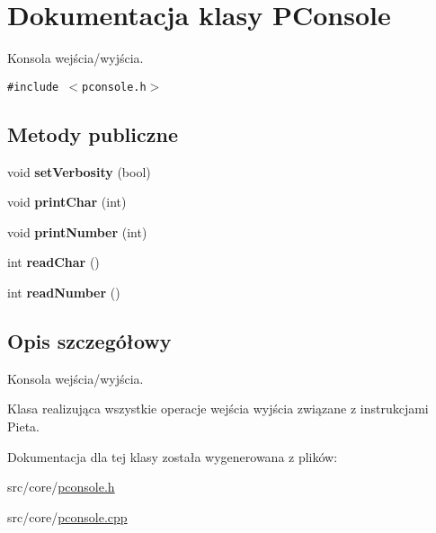 \hypertarget{classPConsole}{
\section{Dokumentacja klasy PConsole}
\label{classPConsole}
}
Konsola wejścia/wyjścia.  


{\tt \#include $<$pconsole.h$>$}

\subsection*{Metody publiczne}
\begin{CompactItemize}
\item 
\hypertarget{classPConsole_b5446c4f888fe9552788a2e757f23b6b}{
void \textbf{setVerbosity} (bool)}
\label{classPConsole_b5446c4f888fe9552788a2e757f23b6b}

\item 
\hypertarget{classPConsole_1c0c7c5be680cdb2e456e3e34798c7a6}{
void \textbf{printChar} (int)}
\label{classPConsole_1c0c7c5be680cdb2e456e3e34798c7a6}

\item 
\hypertarget{classPConsole_744226ceb9724625cadf1124a2b87f55}{
void \textbf{printNumber} (int)}
\label{classPConsole_744226ceb9724625cadf1124a2b87f55}

\item 
\hypertarget{classPConsole_5bf368ed172de8c7e8221973b3c613c3}{
int \textbf{readChar} ()}
\label{classPConsole_5bf368ed172de8c7e8221973b3c613c3}

\item 
\hypertarget{classPConsole_fbe2b8e906db6d9fc70397d8a9b4105c}{
int \textbf{readNumber} ()}
\label{classPConsole_fbe2b8e906db6d9fc70397d8a9b4105c}

\end{CompactItemize}


\subsection{Opis szczegółowy}
Konsola wejścia/wyjścia. 

Klasa realizująca wszystkie operacje wejścia wyjścia związane z instrukcjami Pieta. 

Dokumentacja dla tej klasy została wygenerowana z plików:\begin{CompactItemize}
\item 
src/core/\hyperlink{pconsole_8h}{pconsole.h}\item 
src/core/\hyperlink{pconsole_8cpp}{pconsole.cpp}\end{CompactItemize}
